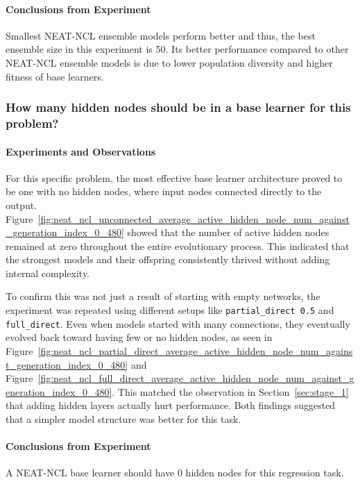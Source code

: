 \documentclass{article}
\begin{document}
\paragraph{Conclusions from Experiment}
Smallest NEAT-NCL ensemble models perform better and thus, the best ensemble size in this experiment is 50. Its better performance compared to other NEAT-NCL ensemble models is due to lower population diversity and higher fitness of base learners. 


\subsubsection{How many hidden nodes should be in a base learner for this problem? }
\paragraph{Experiments and Observations}
For this specific problem, the most effective base learner architecture proved to be one with no hidden nodes, where input nodes connected directly to the output. Figure~\ref{fig:neat_ncl_unconnected_average_active_hidden_node_num_against_generation_index_0_480} showed that the number of active hidden nodes remained at zero throughout the entire evolutionary process. This indicated that the strongest models and their offspring consistently thrived without adding internal complexity. 

To confirm this was not just a result of starting with empty networks, the experiment was repeated using different setups like \lstinline|partial_direct 0.5| and \lstinline|full_direct|. Even when models started with many connections, they eventually evolved back toward having few or no hidden nodes, as seen in Figure~\ref{fig:neat_ncl_partial_direct_average_active_hidden_node_num_against_generation_index_0_480} and Figure~\ref{fig:neat_ncl_full_direct_average_active_hidden_node_num_against_generation_index_0_480}. This matched the observation in Section~\ref{sec:stage_1} that adding hidden layers actually hurt performance. Both findings suggested that a simpler model structure was better for this task. 

\paragraph{Conclusions from Experiment}
A NEAT-NCL base learner should have 0 hidden nodes for this regression task. 


\end{document}
